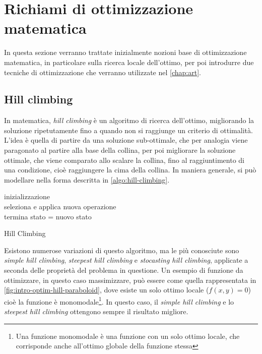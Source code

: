 \section{Richiami di ottimizzazione matematica}
\label{chap:intro-optim}
In questa sezione verranno trattate inizialmente nozioni base di ottimizzazione matematica, in particolare sulla ricerca locale dell'ottimo, per poi introdurre due tecniche di ottimizzazione che verranno utilizzate nel \autoref{chap:art}.

\subsection{Hill climbing}
\label{chap:intro-optim-hill}
In matematica, \textit{hill climbing} è un algoritmo di ricerca dell'ottimo, migliorando la soluzione ripetutamente fino a quando non si raggiunge un criterio di ottimalità. L'idea è quella di partire da una soluzione sub-ottimale, che per analogia viene paragonato al partire alla base della collina, per poi migliorare la soluzione ottimale, che viene comparato allo scalare la collina, fino al raggiuntimento di una condizione, cioè raggiungere la cima della collina. In maniera generale, si può modellare nella forma descritta in \autoref{algo:hill-climbing}.
\begin{algorithm}[H]
    \SetAlgoLined
    inizializzazione \\
     {
        seleziona e applica nuova operazione \\
         {
            termina
        }
         {
            stato = nuovo stato
        }
    }
    \caption{Hill Climbing}
    \label{algo:hill-climbing}
\end{algorithm}
\vspace{4ex}
Esistono numerose variazioni di questo algoritmo, ma le più conosciute sono \textit{simple hill climbing}, \textit{steepest hill climbing} e \textit{stocasting hill climbing}, applicate a seconda delle proprietà del problema in questione. Un esempio di funzione da ottimizzare, in questo caso massimizzare, può essere come quella rappresentata in \autoref{fig:intro-optim-hill-paraboloid}, dove esiste un solo ottimo locale ($f(x, y) = 0$) cioè la funzione è monomodale\footnote{Una funzione monomodale è una funzione con un solo ottimo locale, che corrisponde anche all'ottimo globale della funzione stessa}. In questo caso, il \textit{simple hill climbing} e lo \textit{steepest hill climbing} ottengono sempre il risultato migliore.

